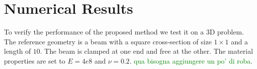 \section{Numerical Results}
\label{sec:numerical_results}
To verify the performance of the proposed method we test it on a 3D problem. The reference geometry is a beam  with a square cross-section of size $1 \times 1$ and a length of $10$. The beam is clamped at one end and free at the other. The material properties are set to $E = 4e8$ and $\nu = 0.2$. \textcolor{green}{qua bisogna aggiungere un po' di roba}.